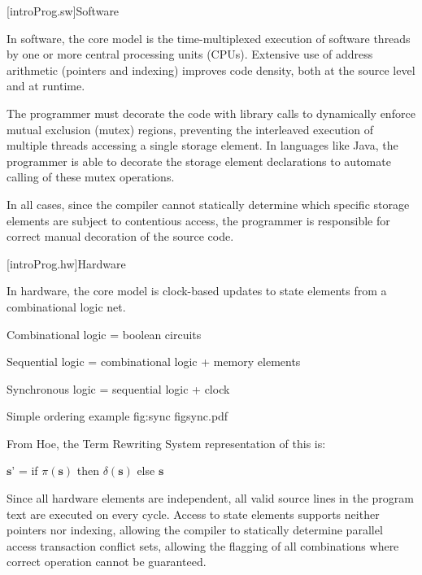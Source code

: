 
\pnum
{}[introProg.sw]{Software}

In software, the core model is the time-multiplexed execution
of software threads by one or more central processing units (CPUs).
Extensive use of address arithmetic (pointers
and indexing) improves code density, both at the source level and at
runtime.

The programmer
must decorate the code with library calls to dynamically enforce
mutual exclusion (mutex) regions, preventing the interleaved execution of
multiple threads accessing a single storage element.
In languages like Java, the programmer is able to decorate the
storage element declarations to automate calling of these mutex operations.

In all cases, since the compiler cannot statically determine which specific
storage elements are subject to contentious access, the programmer is responsible
for correct manual decoration of the source code.

[introProg.hw]{Hardware}

In hardware, the core model is clock-based updates to state elements from
a combinational logic net.

Combinational logic = boolean circuits

Sequential logic = combinational logic + memory elements

Synchronous logic = sequential logic + clock

\begin{importgraphic}
{Simple ordering example}
{fig:sync}
{figsync.pdf}
\end{importgraphic}

From Hoe\cite{Hoe:Thesis}, the Term Rewriting System representation of this is:

$\textbf{s'}$ = if $\pi(\textbf{s})$ then $\delta(\textbf{s})$ else $\textbf{s}$

Since all hardware elements are independent, all valid source lines in the
program text are executed on every cycle.
Access to state elements supports neither pointers nor indexing, allowing the
compiler to statically determine parallel access transaction conflict sets,
allowing the flagging of all combinations where correct operation cannot
be guaranteed.

